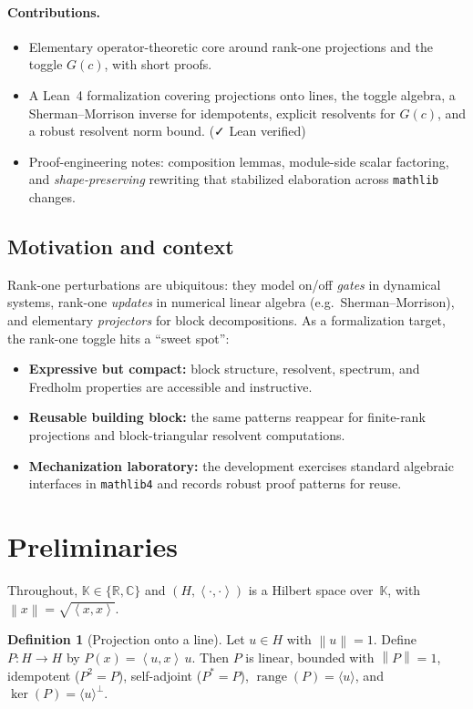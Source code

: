 \documentclass[11pt]{article}
\theoremstyle{definition}
\newtheorem{definition}[theorem]{Definition}
\newcommand{\K}{\mathbb{K}}
\newcommand{\R}{\mathbb{R}}
\newcommand{\C}{\mathbb{C}}
\newcommand{\ip}[2]{\left\langle #1,#2\right\rangle}
\newcommand{\norm}[1]{\left\lVert #1\right\rVert}
\DeclareMathOperator{\range}{range}
\DeclareMathOperator{\kerop}{ker}
\newcommand{\leanok}{\textsf{\small \textcolor{green!60!black}{✓ Lean verified}}}
\begin{document}
\paragraph{Contributions.}
\begin{itemize}
\item Elementary operator-theoretic core around rank-one projections and the toggle $G(c)$, with short proofs.
\item A Lean~4 formalization covering projections onto lines, the toggle algebra, a Sherman--Morrison inverse for idempotents, explicit resolvents for $G(c)$, and a robust resolvent norm bound. (\leanok)
\item Proof-engineering notes: composition lemmas, module-side scalar factoring, and \emph{shape-preserving} rewriting that stabilized elaboration across \texttt{mathlib} changes.
\end{itemize}

\subsection*{Motivation and context}
Rank-one perturbations are ubiquitous: they model on/off \emph{gates} in dynamical systems, rank-one \emph{updates} in numerical linear algebra (e.g.\ Sherman--Morrison), and elementary \emph{projectors} for block decompositions. As a formalization target, the rank-one toggle hits a ``sweet spot'':
\begin{itemize}
\item \textbf{Expressive but compact:} block structure, resolvent, spectrum, and Fredholm properties are accessible and instructive.
\item \textbf{Reusable building block:} the same patterns reappear for finite-rank projections and block-triangular resolvent computations.
\item \textbf{Mechanization laboratory:} the development exercises standard algebraic interfaces in \texttt{mathlib4} and records robust proof patterns for reuse.
\end{itemize}

\section{Preliminaries}

Throughout, $\K\in\{\R,\C\}$ and $(H,\ip{\cdot}{\cdot})$ is a Hilbert space over~$\K$, with $\norm{x}=\sqrt{\ip{x}{x}}$.

\begin{definition}[Projection onto a line]\label{def:proj}
Let $u\in H$ with $\norm{u}=1$. Define $P:H\to H$ by $P(x)=\ip{u}{x}\,u$. Then $P$ is linear, bounded with $\norm{P}=1$, idempotent ($P^2=P$), self-adjoint ($P^\ast=P$), $\range(P)=\langle u\rangle$, and $\kerop(P)=\langle u\rangle^\perp$.
\end{definition}
\end{document}

